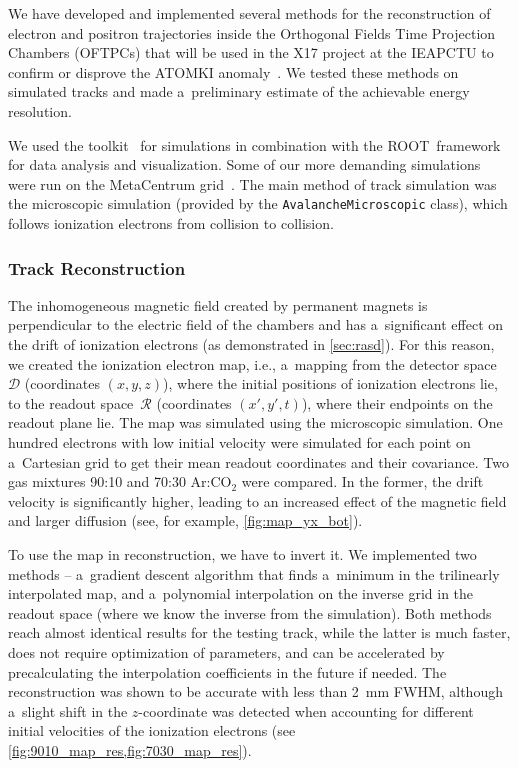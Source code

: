 	We have developed and implemented several methods for the reconstruction of electron and positron trajectories inside the Orthogonal Fields Time Projection Chambers (\acp{OFTPC}) that will be used in the X17 project at the \acf{IEAPCTU} to confirm or disprove the ATOMKI anomaly~\cite{atomki_be}. We tested these methods on simulated tracks and made a~preliminary estimate of the achievable energy resolution.
	
	We used the \garfieldpp toolkit~\cite{Garfield++} for simulations in combination with the ROOT~framework~\cite{ROOT} for data analysis and visualization. Some of our more demanding simulations were run on the MetaCentrum grid~\cite{metacentrum}. The main method of track simulation was the microscopic simulation (provided by the \texttt{Avalanche\-Microscopic} class), which follows ionization electrons from collision to collision.
	
	\subsubsection*{Track Reconstruction}
		The inhomogeneous magnetic field created by permanent magnets is perpendicular to the electric field of the chambers and has a~significant effect on the drift of ionization electrons (as demonstrated in \cref{sec:rasd}). For this reason, we created the ionization electron map, i.e., a~mapping from the detector space~$\mathcal{D}$ (coordinates $(x,y,z)$), where the initial positions of ionization electrons lie, to the readout space~$\mathcal{R}$ (coordinates $(x',y',t)$), where their endpoints on the readout plane lie. The map was simulated using the microscopic simulation. One hundred electrons with low initial velocity were simulated for each point on a~Cartesian grid to get their mean readout coordinates and their covariance. Two gas mixtures 90:10 and 70:30 Ar:CO$_2$ were compared. In the former, the drift velocity is significantly higher, leading to an increased effect of the magnetic field and larger diffusion (see, for example, \cref{fig:map_yx_bot}).
		
		To use the map in reconstruction, we have to invert it. We implemented two methods -- a~gradient descent algorithm that finds a~minimum in the trilinearly interpolated map, and a~polynomial interpolation on the inverse grid in the readout space (where we know the inverse from the simulation). Both methods reach almost identical results for the testing track, while the latter is much faster, does not require optimization of parameters, and can be accelerated by precalculating the interpolation coefficients in the future if needed. The reconstruction was shown to be accurate with less than \qty{2}{\mm} \acs{FWHM}, although a~slight shift in the $z$\nobreakdash-coordinate was detected when accounting for different initial velocities of the ionization electrons (see \cref{fig:9010_map_res,fig:7030_map_res}).
		
